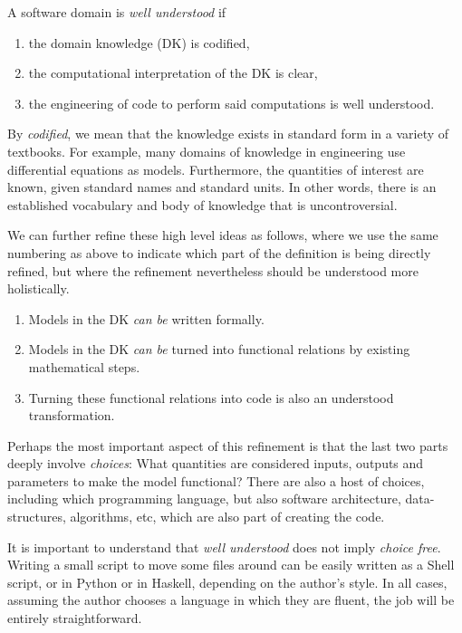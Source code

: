 \documentclass[sigconf,review]{acmart}
\begin{document}
\begin{defn}
A software domain is \emph{well understood} if
\begin{enumerate}
\item the domain knowledge (DK) is codified,
\item the computational interpretation of the DK is clear,
\item the engineering of code to perform said computations is well
understood.
\end{enumerate}
\end{defn}

By \emph{codified}, we mean that the knowledge exists in standard form in
a variety of textbooks. For example, many domains of knowledge in engineering
use differential equations as models. Furthermore, the quantities of interest
are known, given standard names and standard units. In other words, there is
an established vocabulary and body of knowledge that is uncontroversial.

We can further refine these high level ideas as follows, where we use
the same numbering as above to indicate which part of the definition is
being directly refined, but where the refinement nevertheless should be
understood more holistically.
\begin{enumerate}
\item Models in the DK \emph{can be} written formally.
\item Models in the DK \emph{can be} turned into functional relations by
 existing mathematical steps.
\item Turning these functional relations into code is also an understood
 transformation.
\end{enumerate}
Perhaps the most important aspect of this refinement is that the last two
parts deeply involve \emph{choices}: What quantities are considered inputs,
outputs and parameters to make the model functional? There are also a host
of choices, including which programming language, but also software
architecture, data-structures, algorithms, etc, which are also part of
creating the code.

It is important to understand that \emph{well understood} does not imply
\emph{choice free}.  Writing a small script to move some files around can
be easily written as a Shell script, or in Python or in Haskell, depending on
the author's style. In all cases, assuming the author chooses a language
in which they are fluent, the job will be entirely straightforward.
\end{document}

